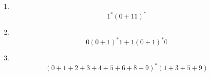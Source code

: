\documentclass{article}
\begin{document}
1.
\[
1^{*}(0 + 11)^{*}    
\]

2.
\[
0(0 + 1)^{*}1 + 1(0 + 1)^{*}0    
\]

3.
\[
(0 + 1 + 2 + 3 + 4 + 5 + 6 + 8 + 9)^{*}(1 + 3 +  5 + 9)
\]
\end{document}

